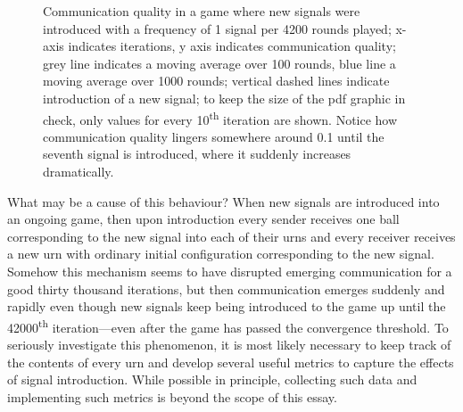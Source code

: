 \documentclass[
	DIV=calc,
	BCOR=0mm,
	pagesize,
	titlepage
]{scrartcl}
\newcommand{\dash}{—}
\begin{document}
\begin{figure}
	\centering
	\caption{Communication quality in a game where new signals were introduced with a frequency of 1 signal per 4200 rounds played; x-axis indicates iterations, y axis indicates communication quality; grey line indicates a moving average over 100 rounds, blue line a moving average over 1000 rounds; vertical dashed lines indicate introduction of a new signal; to keep the size of the pdf graphic in check, only values for every 10\textsuperscript{th} iteration are shown. Notice how communication quality lingers somewhere around 0.1 until the seventh signal is introduced, where it suddenly increases dramatically.}
	\label{fig:com}
\end{figure}

What may be a cause of this behaviour?
When new signals are introduced into an ongoing game, then upon introduction every sender receives one ball corresponding to the new signal into each of their urns and every receiver receives a new urn with ordinary initial configuration corresponding to the new signal.
Somehow this mechanism seems to have disrupted emerging communication for a good thirty thousand iterations, but then communication emerges suddenly and rapidly even though new signals keep being introduced to the game up until the 42000\textsuperscript{th} iteration\dash even after the game has passed the convergence threshold.
To seriously investigate this phenomenon, it is most likely necessary to keep track of the contents of every urn and develop several useful metrics to capture the effects of signal introduction.
While possible in principle, collecting such data and implementing such metrics is beyond the scope of this essay.
\end{document}
